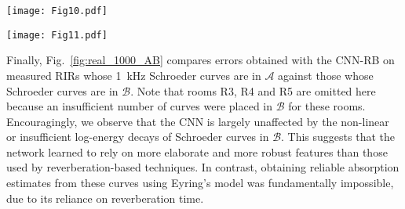 \documentclass[reprint]{JASA}
\begin{document}
\begin{figure*}[!t]
	\begin{minipage}{0.54\textwidth}
		\texttt{[image: Fig10.pdf]}
		\caption{Comparison of $\bar{\alpha}(\textrm{1000 Hz})$ estimation errors over measured RIRs in 10 rooms using Eyring and CNN-RB. Only selected RIRs with Schroeder curves in $\mathcal{A}$ are included.}
		\label{fig:real_1000}
	\end{minipage}
	\hfill
	\begin{minipage}{0.39\textwidth}
		\texttt{[image: Fig11.pdf]}
		\caption{Comparison of $\bar{\alpha}(\textrm{1000 Hz})$ CNN-RB estimation errors over measured RIRs with 1~kHz Schroeder curves in $\mathcal{A}$ vs. in $\mathcal{B}$.}
		\label{fig:real_1000_AB}
	\end{minipage}
\end{figure*}

Finally, Fig.~\ref{fig:real_1000_AB} compares errors obtained with the CNN-RB on measured RIRs whose 1~kHz Schroeder curves are in $\mathcal{A}$ against those whose Schroeder curves are in $\mathcal{B}$. Note that rooms R3, R4 and R5 are omitted here because an insufficient number of curves were placed in $\mathcal{B}$ for these rooms. Encouragingly, we observe that the CNN is largely unaffected by the non-linear or insufficient log-energy decays of Schroeder curves in $\mathcal{B}$. This suggests that the network learned to rely on more elaborate and more robust features than those used by reverberation-based techniques. In contrast, obtaining reliable absorption estimates from these curves using Eyring's model was fundamentally impossible, due to its reliance on reverberation time.
\end{document}
